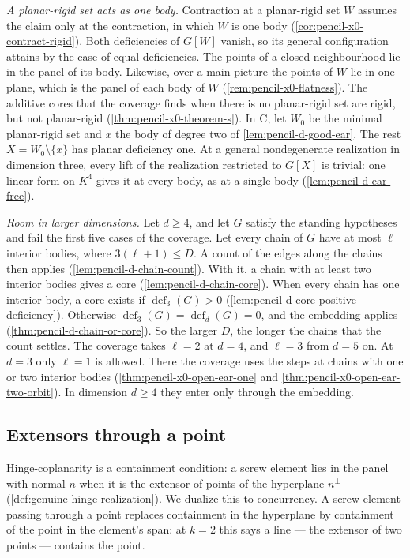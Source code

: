 \emph{A planar-rigid set acts as one body.} Contraction at a
planar-rigid set $W$ assumes the claim only at the contraction, in which
$W$ is one body (\cref{cor:pencil-x0-contract-rigid}). Both deficiencies
of $G[W]$ vanish, so its general configuration attains by the case of
equal deficiencies. The points of a closed neighbourhood lie in the panel
of its body. Likewise, over a main picture the points of $W$ lie in one
plane, which is the panel of each body of $W$
(\cref{rem:pencil-x0-flatness}). The additive cores that the coverage
finds when there is no planar-rigid set are rigid, but not planar-rigid
(\cref{thm:pencil-x0-theorem-s}). In C, let $W_0$ be the minimal
planar-rigid set and $x$ the body of degree two of
\cref{lem:pencil-d-good-ear}. The rest $X = W_0 \setminus \{x\}$ has
planar deficiency one. At a general nondegenerate realization in
dimension three, every lift of the realization restricted to $G[X]$ is
trivial: one linear form on $K^4$ gives it at every body, as at a single
body (\cref{lem:pencil-d-ear-free}).

\emph{Room in larger dimensions.} Let $d \ge 4$, and let $G$ satisfy the
standing hypotheses and fail the first five cases of the coverage. Let
every chain of $G$ have at most $\ell$ interior bodies, where $3(\ell +
1) \le D$. A count of the edges along the chains then applies
(\cref{lem:pencil-d-chain-count}). With it, a chain with at least two
interior bodies gives a core (\cref{lem:pencil-d-chain-core}). When
every chain has one interior body, a core exists if
$\operatorname{def}_3(G) > 0$
(\cref{lem:pencil-d-core-positive-deficiency}). Otherwise
$\operatorname{def}_3(G) = \operatorname{def}_d(G) = 0$, and the
embedding applies (\cref{thm:pencil-d-chain-or-core}). So the larger
$D$, the longer the chains that the count settles. The coverage takes
$\ell = 2$ at $d = 4$, and $\ell = 3$ from $d = 5$ on. At $d = 3$ only
$\ell = 1$ is allowed. There the coverage uses the steps at chains with
one or two interior bodies (\cref{thm:pencil-x0-open-ear-one} and
\cref{thm:pencil-x0-open-ear-two-orbit}). In dimension $d \ge 4$ they
enter only through the embedding.

\subsection{Extensors through a point}
\label{sec:pencil-through-point}

Hinge-coplanarity is a containment condition: a screw element lies in
the panel with normal $n$ when it is the extensor of points of the
hyperplane $n^{\perp}$ (\cref{def:genuine-hinge-realization}). We
dualize this to concurrency. A screw element passing through a point
replaces containment in the hyperplane by containment of the point in
the element's span: at $k = 2$ this says a line --- the extensor of two
points --- contains the point.

